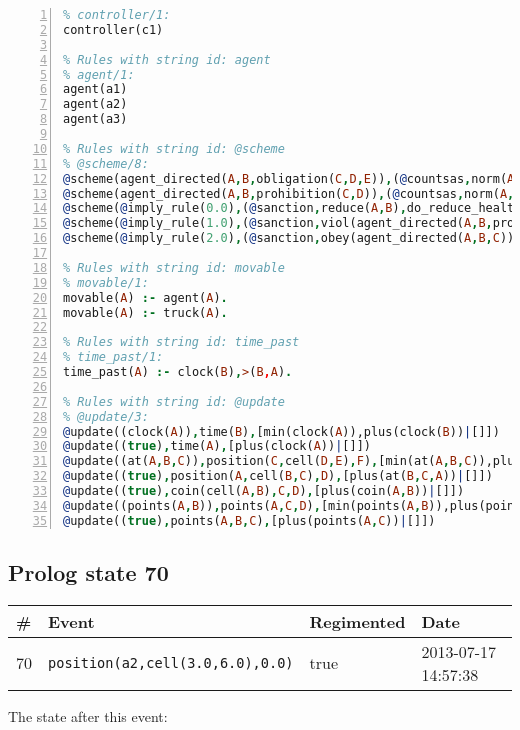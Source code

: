 \documentclass[11pt]{article}\usepackage[utf8]{inputenc}\usepackage{geometry}
\begin{document}
\begin{lstlisting}[language=Prolog, numbers=left]
% Rules with string id: controller
% controller/1:
controller(c1)

% Rules with string id: agent
% agent/1:
agent(a1)
agent(a2)
agent(a3)

% Rules with string id: @scheme
% @scheme/8:
@scheme(agent_directed(A,B,obligation(C,D,E)),(@countsas,norm(A,B,F,obligation(C,D,E)),F),false,(listTrue(C)),(time_past(D)),false,[plus(viol(agent_directed(A,B,obligation(C,D,E))))|[]],[plus(obey(agent_directed(A,B,obligation(C,D,E))))|[]])
@scheme(agent_directed(A,B,prohibition(C,D)),(@countsas,norm(A,B,E,prohibition(C,D)),E),(listTrue(C)),false,(false),false,[plus(viol(agent_directed(A,B,prohibition(C,D))))|[]],[plus(obey(agent_directed(A,B,prohibition(C,D))))|[]])
@scheme(@imply_rule(0.0),(@sanction,reduce(A,B),do_reduce_health(A,B),notifyAgent(A,changed(status))),true,false,false,false,[min(reduce(A,B))|[]],[])
@scheme(@imply_rule(1.0),(@sanction,viol(agent_directed(A,B,prohibition(C,D))),do_sanction(D)),true,false,false,false,[min(viol(agent_directed(A,B,prohibition(C,D))))|[]],[])
@scheme(@imply_rule(2.0),(@sanction,obey(agent_directed(A,B,C))),true,false,false,false,[min(obey(agent_directed(A,B,C)))|[]],[])

% Rules with string id: movable
% movable/1:
movable(A) :- agent(A).
movable(A) :- truck(A).

% Rules with string id: time_past
% time_past/1:
time_past(A) :- clock(B),>(B,A).

% Rules with string id: @update
% @update/3:
@update((clock(A)),time(B),[min(clock(A)),plus(clock(B))|[]])
@update((true),time(A),[plus(clock(A))|[]])
@update((at(A,B,C)),position(C,cell(D,E),F),[min(at(A,B,C)),plus(at(D,E,C))|[]])
@update((true),position(A,cell(B,C),D),[plus(at(B,C,A))|[]])
@update((true),coin(cell(A,B),C,D),[plus(coin(A,B))|[]])
@update((points(A,B)),points(A,C,D),[min(points(A,B)),plus(points(A,D))|[]])
@update((true),points(A,B,C),[plus(points(A,C))|[]])

\end{lstlisting}
\clearpage 
\subsection{Prolog state 70}
\begin{table}[ht]
\centering 
\begin{tabular}{l l l l} 
\textbf{\#} & \textbf{Event} & \textbf{Regimented} & \textbf{Date} \\ [0.5ex] 
\hline
70&\texttt{position(a2,cell(3.0,6.0),0.0)}&true&2013-07-17 14:57:38\\ [1ex] \hline\end{tabular}
\end{table}
The state after this event:
\end{document}
